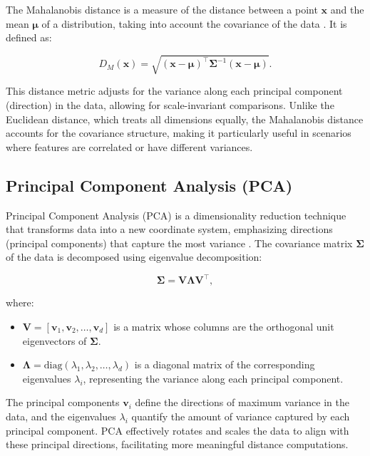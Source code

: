 The Mahalanobis distance is a measure of the distance between a point $\mathbf{x}$ and the mean $\boldsymbol{\mu}$ of a distribution, taking into account the covariance of the data \citep{mahalanobis1936generalized, demaesschalck2000mahalanobis}. It is defined as:

\begin{equation}
\label{eq:mahalanobis_distance}
D_M(\mathbf{x}) = \sqrt{ (\mathbf{x} - \boldsymbol{\mu})^\top \boldsymbol{\Sigma}^{-1} (\mathbf{x} - \boldsymbol{\mu}) }.
\end{equation}

This distance metric adjusts for the variance along each principal component (direction) in the data, allowing for scale-invariant comparisons. Unlike the Euclidean distance, which treats all dimensions equally, the Mahalanobis distance accounts for the covariance structure, making it particularly useful in scenarios where features are correlated or have different variances.

\subsection{Principal Component Analysis (PCA)}

Principal Component Analysis (PCA) is a dimensionality reduction technique that transforms data into a new coordinate system, emphasizing directions (principal components) that capture the most variance \citep{jolliffe2002principal}. The covariance matrix $\boldsymbol{\Sigma}$ of the data is decomposed using eigenvalue decomposition:

\begin{equation}
\boldsymbol{\Sigma} = \mathbf{V} \boldsymbol{\Lambda} \mathbf{V}^\top,
\end{equation}

where:
\begin{itemize}
    \item $\mathbf{V} = [\mathbf{v}_1, \mathbf{v}_2, \dots, \mathbf{v}_d]$ is a matrix whose columns are the orthogonal unit eigenvectors of $\boldsymbol{\Sigma}$.
    \item $\boldsymbol{\Lambda} = \text{diag}(\lambda_1, \lambda_2, \dots, \lambda_d)$ is a diagonal matrix of the corresponding eigenvalues $\lambda_i$, representing the variance along each principal component.
\end{itemize}

The principal components $\mathbf{v}_i$ define the directions of maximum variance in the data, and the eigenvalues $\lambda_i$ quantify the amount of variance captured by each principal component. PCA effectively rotates and scales the data to align with these principal directions, facilitating more meaningful distance computations.

